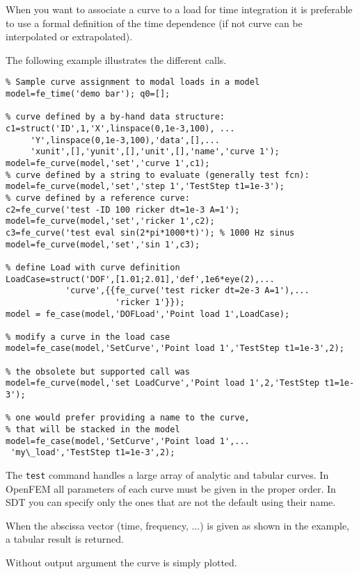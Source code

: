 When you want to associate a curve to a load for time integration it is preferable to use a formal definition of the time dependence (if not curve can be interpolated or extrapolated).

The following example illustrates the different calls.

\begin{verbatim}
% Sample curve assignment to modal loads in a model
model=fe_time('demo bar'); q0=[];

% curve defined by a by-hand data structure:
c1=struct('ID',1,'X',linspace(0,1e-3,100), ...
     'Y',linspace(0,1e-3,100),'data',[],...
     'xunit',[],'yunit',[],'unit',[],'name','curve 1');
model=fe_curve(model,'set','curve 1',c1);
% curve defined by a string to evaluate (generally test fcn):
model=fe_curve(model,'set','step 1','TestStep t1=1e-3');
% curve defined by a reference curve:
c2=fe_curve('test -ID 100 ricker dt=1e-3 A=1');
model=fe_curve(model,'set','ricker 1',c2);
c3=fe_curve('test eval sin(2*pi*1000*t)'); % 1000 Hz sinus
model=fe_curve(model,'set','sin 1',c3);

% define Load with curve definition
LoadCase=struct('DOF',[1.01;2.01],'def',1e6*eye(2),...
            'curve',{{fe_curve('test ricker dt=2e-3 A=1'),...
                      'ricker 1'}});
model = fe_case(model,'DOFLoad','Point load 1',LoadCase);

% modify a curve in the load case
model=fe_case(model,'SetCurve','Point load 1','TestStep t1=1e-3',2);

% the obsolete but supported call was
model=fe_curve(model,'set LoadCurve','Point load 1',2,'TestStep t1=1e-3');

% one would prefer providing a name to the curve, 
% that will be stacked in the model
model=fe_case(model,'SetCurve','Point load 1',...
 'my\_load','TestStep t1=1e-3',2);
\end{verbatim}%



The {\tt test} command handles a large array of analytic and tabular curves. 
In OpenFEM all parameters of each curve must be given in the proper order.  In SDT you can specify only the ones that are not the default using their name.

When the abscissa vector (time, frequency, ...) is given as shown in the example, a tabular result is returned.  

Without output argument the curve is simply plotted.


